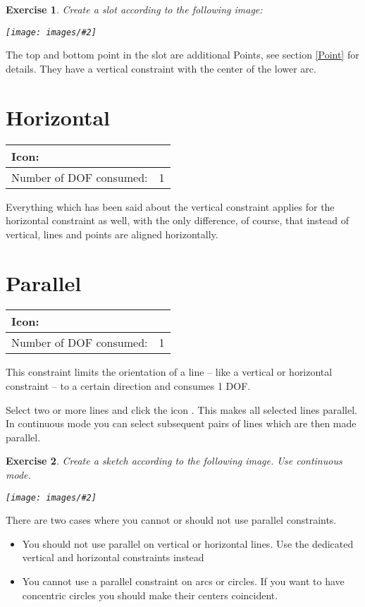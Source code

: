 \documentclass[12pt,titlepage]{article}
\newcommand{\icon}[1]{\raisebox{-1em}{\rule{0pt}{27pt}\texttt{[image: images/\#1]}}}
\newcommand{\img}[2]{\vspace{2ex}\noindent\texttt{[image: images/\#2]}}
\newcommand{\dofConsumed}{Number of DOF consumed:}
\newtheorem{Exercise}{Exercise}
\begin{document}
\begin{Exercise} Create a slot according to the following image:
	
	\img{scale=0.7}{VerticalPoints} \end{Exercise} The top and bottom point in the slot are additional Points, see section \vref{Point} for details. They have a vertical constraint with the center of the lower arc.


\section{Horizontal} \label{Horizontal} \begin{tabular}{|l|l|} \hline Icon: & \icon{Constraint_Horizontal}\\ \hline \dofConsumed & 1 \\ \hline \end{tabular}

Everything which has been said about the vertical constraint applies for the horizontal constraint as well, with the only difference, of course, that instead of vertical, lines and points are aligned horizontally.

\section{Parallel} \begin{tabular}{|l|l|} \hline Icon: & \icon{Constraint_Parallel}\\ \hline \dofConsumed & 1 \\ \hline \end{tabular}

This constraint limits the orientation of a line -- like a vertical or horizontal constraint -- to a certain direction and consumes 1 DOF.

Select two or more lines and click the icon \icon{Constraint_Parallel}. This makes all selected lines parallel. In continuous mode you can select subsequent pairs of lines which are then made parallel.

\begin{Exercise} Create a sketch according to the following image. Use continuous mode.
	
	\img{width=0.6\textwidth}{Parallelogramm} \end{Exercise}

There are two cases where you cannot or should not use parallel constraints. 
\begin{itemize} 
\item You should not use parallel on vertical or horizontal lines. Use the dedicated vertical and horizontal constraints instead 
\item You cannot use a parallel constraint on arcs or circles. If you want to have concentric circles you should make their centers coincident. 
\end{itemize} 
\end{document}
